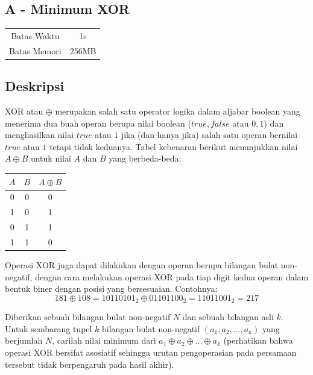 \documentclass{article}
\begin{document}
\begin{center}
    \section*{A - Minimum XOR} %

    \begin{tabular}{ | c c | }
        \hline
        Batas Waktu  & 1s \\    %
        Batas Memori & 256MB \\  %
        \hline
    \end{tabular}
\end{center}

\subsection*{Deskripsi}
XOR atau $\oplus$ merupakan salah satu operator logika dalam aljabar boolean yang menerima dua buah operan berupa nilai boolean ($true, false$ atau $0, 1$) dan menghasilkan nilai $true$ atau $1$ jika (dan hanya jika) salah satu operan bernilai $true$ atau $1$ tetapi tidak keduanya. Tabel kebenaran berikut menunjukkan nilai $A \oplus B$ untuk nilai $A$ dan $B$ yang berbeda-beda: 

\begin{center}
\begin{tabular}{c|c|c}
$A$ & $B$ & $A \oplus  B$ \\ \hline
0 & 0 & 0       \\
1 & 0 & 1       \\
0 & 1 & 1       \\
1 & 1 & 0
\end{tabular}
\end{center}
Operasi XOR juga dapat dilakukan dengan operan berupa bilangan bulat non-negatif, dengan cara melakukan operasi XOR pada tiap digit kedua operan dalam bentuk biner dengan posisi yang bersesuaian. Contohnya:
$$ 181 \oplus 108 = 10110101_2 \oplus 01101100_2 = 11011001_2 = 217 $$

Diberikan sebuah bilangan bulat non-negatif $N$ dan sebuah bilangan asli $k$. Untuk sembarang tupel $k$ bilangan bulat non-negatif $(a_1, a_2, \ldots, a_k)$ yang berjumlah $N$, carilah nilai minimum dari $a_1 \oplus a_2 \oplus \ldots \oplus a_k$ (perhatikan bahwa operasi XOR bersifat asosiatif sehingga urutan pengoperasian pada persamaan tersebut tidak berpengaruh pada hasil akhir).
\end{document}

